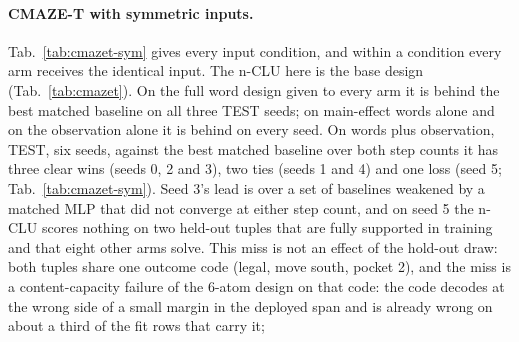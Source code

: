 \documentclass{article} %
\begin{document}
\paragraph{CMAZE-T with symmetric inputs.}
Tab.~\ref{tab:cmazet-sym} gives every input condition, and within a condition every arm receives the
identical input. The n-CLU here is the base design (Tab.~\ref{tab:cmazet}). On the full word design given %
to every arm it is behind the best matched baseline on all three TEST seeds; on main-effect words alone and on the observation alone it is behind on every seed. On words
plus observation, TEST, six seeds, against the
best matched baseline over both step counts it has three
clear wins (seeds 0, 2 and 3), two ties (seeds 1 and 4) and
one loss (seed 5; Tab.~\ref{tab:cmazet-sym}). Seed 3's lead is over a set of baselines weakened
by a matched MLP that did not converge at either step count, and on seed 5 the n-CLU scores nothing on two
held-out tuples that are fully supported in training and that eight other arms solve. This miss is
not an effect of the hold-out draw: both tuples share one outcome code (legal, move south, pocket 2),
and the miss is a content-capacity failure of the 6-atom design on that code: the code decodes at the wrong
side of a small margin in the deployed span and is already wrong on about a third of the fit rows that carry it; %
\end{document}
